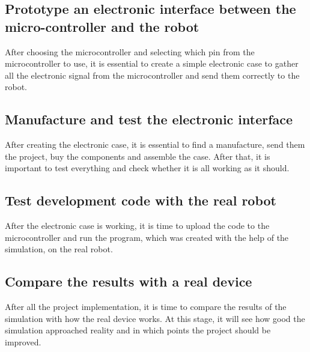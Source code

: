 \documentclass[../monografia.tex]{subfiles}
\begin{document}
\subsection{Prototype an electronic interface between the micro-controller and the robot}

After choosing the microcontroller and selecting which pin from the microcontroller to use, it is essential to create a simple electronic case to gather all the electronic signal from the microcontroller and send them correctly to the robot.

\subsection{Manufacture and test the electronic interface}

After creating the electronic case, it is essential to find a manufacture, send them the project, buy the components and assemble the case. After that, it is important to test everything and check whether it is all working as it should. 

\subsection{Test development code with the real robot}

After the electronic case is working, it is time to upload the code to the microcontroller and run the program, which was created with the help of the simulation, on the real robot. 

\subsection{Compare the results with a real device}
After all the project implementation, it is time to compare the results of the simulation with how the real device works. At this stage, it will see how good  the simulation approached reality and in which points the project should be improved.
\end{document}
